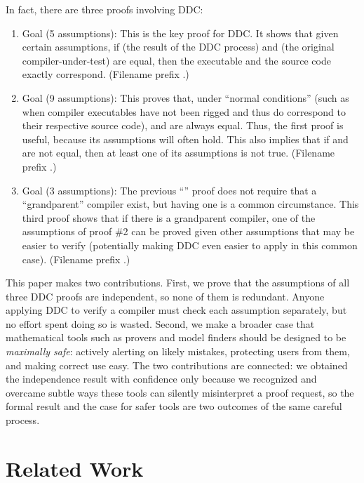 In fact, there are three proofs involving DDC:

\begin{enumerate}
	\item Goal  (5 assumptions): This is the key proof for DDC. It shows that given certain assumptions, if  (the result of the DDC process) and  (the original compiler-under-test) are equal, then the executable  and the source code  exactly correspond. (Filename prefix .)
	\item Goal  (9 assumptions): This proves that, under ``normal conditions'' (such as when compiler executables have not been rigged and thus do correspond to their respective source code),  and  are always equal. Thus, the first proof is useful, because its assumptions will often hold. This also implies that if  and  are not equal, then at least one of its assumptions is not true. (Filename prefix .)
	\item Goal  (3 assumptions): The previous ``'' proof does not require that a ``grandparent'' compiler exist, but having one is a common circumstance. This third proof shows that if there is a grandparent compiler, one of the assumptions of proof \#2 can be proved given other assumptions that may be easier to verify (potentially making DDC even easier to apply in this common case). (Filename prefix .)
\end{enumerate}

This paper makes two contributions. First, we prove that the assumptions of all three DDC proofs are independent, so none of them is redundant. Anyone applying DDC to verify a compiler must check each assumption separately, but no effort spent doing so is wasted. Second, we make a broader case that mathematical tools such as provers and model finders should be designed to be \emph{maximally safe}: actively alerting on likely mistakes, protecting users from them, and making correct use easy. The two contributions are connected: we obtained the independence result with confidence only because we recognized and overcame subtle ways these tools can silently misinterpret a proof request, so the formal result and the case for safer tools are two outcomes of the same careful process.

\section{Related Work}

